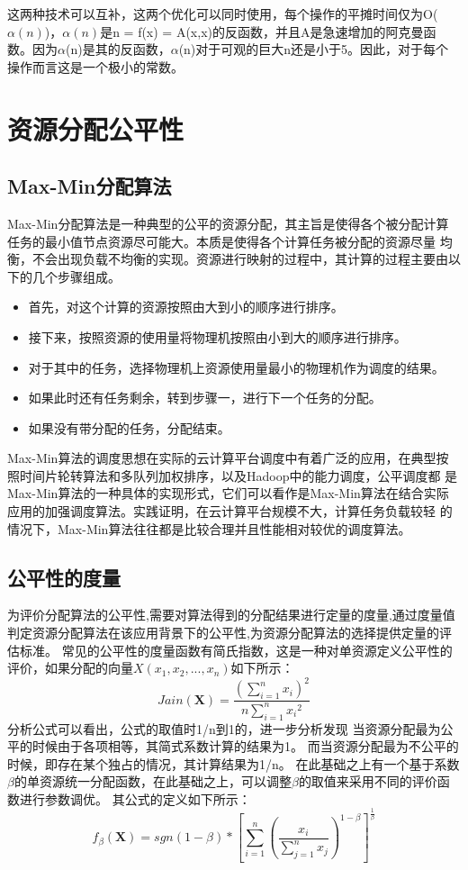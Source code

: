这两种技术可以互补，这两个优化可以同时使用，每个操作的平摊时间仅为O($\alpha(n)$)，$\alpha(n)$是n = f(x) = A(x,x)的反函数，并且A是急速增加的阿克曼函数。因为$\alpha$(n)是其的反函数，$\alpha$(n)对于可观的巨大n还是小于5。因此，对于每个操作而言这是一个极小的常数。

\section{资源分配公平性}
\subsection{Max-Min分配算法}
Max-Min分配算法是一种典型的公平的资源分配，其主旨是使得各个被分配计算任务的最小值节点资源尽可能大。本质是使得各个计算任务被分配的资源尽量
均衡，不会出现负载不均衡的实现。资源进行映射的过程中，其计算的过程主要由以下的几个步骤组成。
\begin{itemize}
\item	首先，对这个计算的资源按照由大到小的顺序进行排序。
\item	接下来，按照资源的使用量将物理机按照由小到大的顺序进行排序。
\item	对于其中的任务，选择物理机上资源使用量最小的物理机作为调度的结果。
\item	如果此时还有任务剩余，转到步骤一，进行下一个任务的分配。
\item	如果没有带分配的任务，分配结束。
\end{itemize}

Max-Min算法的调度思想在实际的云计算平台调度中有着广泛的应用，在典型按照时间片轮转算法和多队列加权排序，以及Hadoop中的能力调度，公平调度都
是Max-Min算法的一种具体的实现形式，它们可以看作是Max-Min算法在结合实际应用的加强调度算法。实践证明，在云计算平台规模不大，计算任务负载较轻
的情况下，Max-Min算法往往都是比较合理并且性能相对较优的调度算法。
\subsection{公平性的度量}
为评价分配算法的公平性,需要对算法得到的分配结果进行定量的度量,通过度量值判定资源分配算法在该应用背景下的公平性,为资源分配算法的选择提供定量的评估标准。
常见的公平性的度量函数有简氏指数，这是一种对单资源定义公平性的评价，如果分配的向量$X({x}_{1},{x}_{2},...,{x}_{n})$如下所示：
\begin{equation}
Jain(\textbf{X}) = \frac{{(\sum_{i=1}^{n}{x}_{i})}^{2}}{n\sum_{i=1}^{n}{{x}_{i}}^{2}}
\end{equation}
分析公式可以看出，公式的取值时1/n到1的，进一步分析发现
当资源分配最为公平的时候由于各项相等，其简式系数计算的结果为1。
而当资源分配最为不公平的时候，即存在某个独占的情况，其计算结果为1/n。
在此基础之上有一个基于系数$\beta$的单资源统一分配函数，在此基础之上，可以调整$\beta$的取值来采用不同的评价函数进行参数调优。
其公式的定义如下所示：
\begin{equation}
{f}_{\beta} (\textbf{X})= sgn(1-\beta)*{\left[\sum_{i=1}^{n}{\left(\frac{{x}_{i}}{\sum_{j=1}^{n}{x}_{j}} \right)}^{1 - \beta} \right]}^{\frac{1}{\beta}}
\end{equation}

